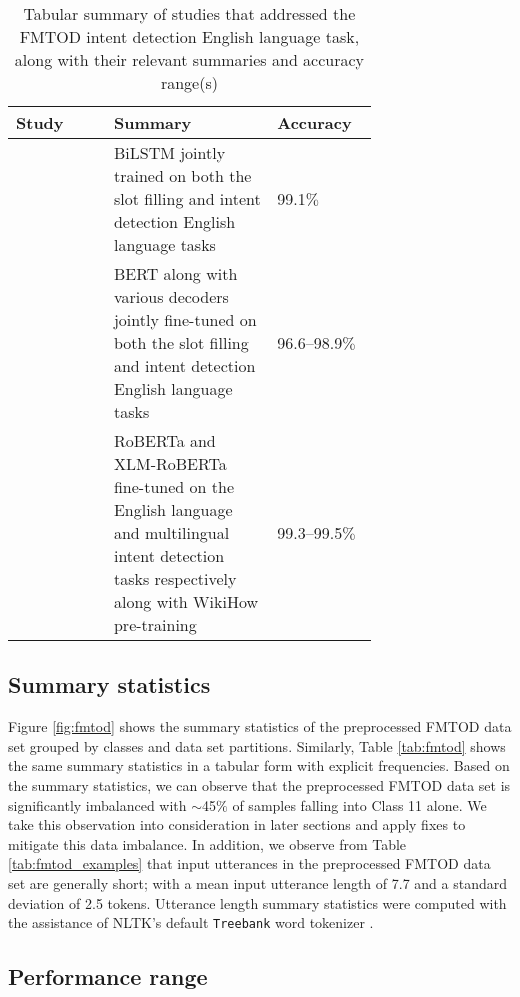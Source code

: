 \begin{table}[t!]
  \centering {}
  \begin{tabular}{L{0.27\linewidth} L{0.45\linewidth} l}
    \toprule
    Study & Summary & Accuracy \\
    \midrule
    \citet{schuster-etal-2019-cross-lingual} & BiLSTM jointly trained on both the slot filling and intent detection English language tasks & 99.1$\%$ \\
    \citet{zhang2019joint} & BERT along with various decoders jointly fine-tuned on both the slot filling and intent detection English language tasks & 96.6--98.9$\%$ \\
    \citet{zhang-etal-2020-intent} & RoBERTa and XLM-RoBERTa fine-tuned on the English language and multilingual intent detection tasks respectively along with WikiHow pre-training & 99.3--99.5$\%$ \\
    \bottomrule
  \end{tabular}
  \caption{Tabular summary of studies that addressed the FMTOD intent detection
    English language task, along with their relevant summaries and accuracy
    range(s)}
  \label{tab:fmtod_results}
\end{table}

\subsection{Summary statistics}

Figure \ref{fig:fmtod} shows the summary statistics of the preprocessed FMTOD
data set grouped by classes and data set partitions. Similarly, Table
\ref{tab:fmtod} shows the same summary statistics in a tabular form with
explicit frequencies. Based on the summary statistics, we can observe that the
preprocessed FMTOD data set is significantly imbalanced with $\sim$45$\%$ of
samples falling into Class 11 alone. We take this observation into consideration
in later sections and apply fixes to mitigate this data imbalance. In addition,
we observe from Table \ref{tab:fmtod_examples} that input utterances in the
preprocessed FMTOD data set are generally short; with a mean input utterance
length of 7.7 and a standard deviation of 2.5 tokens. Utterance length summary
statistics were computed with the assistance of NLTK's default \texttt{Treebank}
word tokenizer \citep{bird-loper-2004-nltk}.

\subsection{Performance range}

